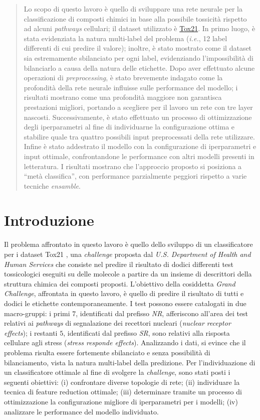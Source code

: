 \begin{abstract}
Lo scopo di questo lavoro è quello di sviluppare una rete neurale per la classificazione di composti chimici in base alla possibile tossicità rispetto ad alcuni \textit{pathways} cellulari; il dataset utilizzato è \href{http://bioinf.jku.at/research/DeepTox/tox21.html}{Tox21}.
In primo luogo, è stata evidenziata la natura multi-label del problema (\textit{i.e.}, 12 label differenti di cui predire il valore); inoltre, è stato mostrato come il dataset sia estremamente sbilanciato per ogni label, evidenziando l'impossibilità di bilanciarlo a causa della natura delle etichette.
Dopo aver effettuato alcune operazioni di \textit{preprocessing}, è stato brevemente indagato come la profondità della rete neurale influisse sulle performance del modello; i risultati mostrano come una profondità maggiore non garantisca prestazioni migliori, portando a scegliere per il lavoro un rete con tre layer nascosti.
Successivamente, è stato effettuato un processo di ottimizzazione degli iperparametri al fine di individuarne la configurazione ottima e stabilire quale tra quattro possibili input preprocessati della rete utilizzare.
Infine è stato addestrato il modello con la configurazione di iperparametri e input ottimale, confrontandone le performance con altri modelli presenti in letteratura.
I risultati mostrano che l'approccio proposto si posiziona a “metà classifica”, con performance parzialmente peggiori rispetto a varie tecniche \textit{ensamble}.
\end{abstract}

\section{Introduzione}
Il problema affrontato in questo lavoro è quello dello sviluppo di un classificatore per i dataset Tox21 \cite{challenge_site}, una \textit{challenge} proposta dal \textit{U.S. Department of Health and Human Services} che consiste nel predire il risultato di dodici differenti test tossicologici eseguiti su delle molecole a partire da un insieme di descrittori della struttura chimica dei composti proposti.
L'obiettivo della cosiddetta \textit{Grand Challenge}, affrontata in questo lavoro, è quello di predire il risultato di tutti e dodici le etichette contemporaneamente. I test possono essere catalogati in due macro-gruppi: i primi $7$, identificati dal prefisso \textit{NR}, afferiscono all'area dei test relativi ai \textit{pathways} di segnalazione dei recettori nucleari (\textit{nuclear receptor effects}); i restanti $5$, identificati dal prefisso \textit{SR}, sono relativi alla risposta cellulare agli stress (\textit{stress responde effects}).
Analizzando i dati, si evince che il problema risulta essere fortemente sbilanciato e senza possibilità di bilanciamento, vista la natura multi-label della predizione.
Per l'individuazione di un classificatore ottimale al fine di svolgere la \textit{challenge}, sono stati posti i seguenti obiettivi: (i) confrontare diverse topologie di rete; (ii) individuare la tecnica di feature reduction ottimale; (iii) determinare tramite un processo di ottimizzazione la configurazione migliore di iperparametri per i modelli; (iv) analizzare le performance del modello individuato.